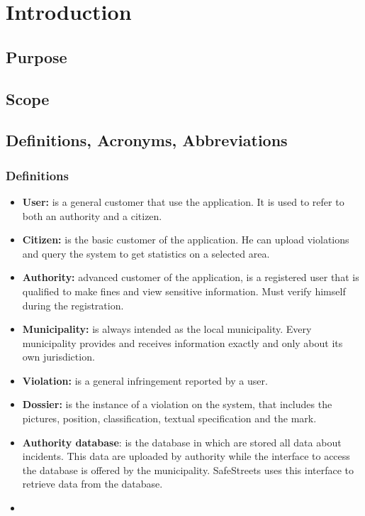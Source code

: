 \documentclass[../RASD.tex]{subfiles}
\begin{document}
    \chapter{Introduction}\label{ch:introduction}
    \section{Purpose}\label{sec:purpose}

    \section{Scope}\label{sec:scope}

    \newpage
    \section{Definitions, Acronyms, Abbreviations}\label{sec:definitions,-acronyms,-abbreviations}
    \subsection{Definitions}\label{subsec:definitions}
    \begin{itemize}
        \item \textbf{User:} is a general customer that use the application.
        It is used to refer to both an authority and a citizen.
        \item \textbf{Citizen:} is the basic customer of the application.
        He can upload violations and query the system to get statistics on a selected area.
        \item \textbf{Authority:} advanced customer of the application, is a registered user that is qualified to make fines and view sensitive information.
        Must verify himself during the registration.
        \item \textbf{Municipality:} is always intended as the local municipality.
        Every municipality provides and receives information exactly and only about its own jurisdiction.
        \item \textbf{Violation:} is a general infringement reported by a user.
        \item  \textbf{Dossier:} is the instance of a violation on the system, that includes the pictures, position, classification, textual specification and the mark.
        \item \textbf{Authority database}: is the database in which are stored all data about incidents.
        This data are uploaded by authority while the interface to access the database is offered by the municipality.
        SafeStreets uses this interface to retrieve data from the database.
        \item
    \end{itemize}
\end{document}
